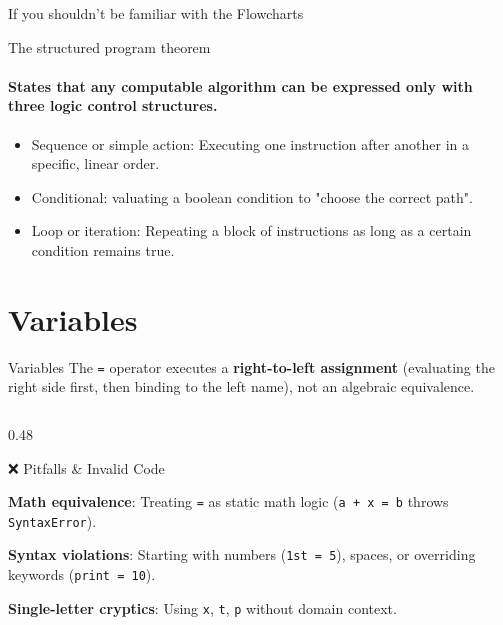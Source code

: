 \documentclass[aspectratio=169,19pt,english]{beamer}
\begin{document}
{\begin{frame}{If you shouldn't be familiar with the Flowcharts}
\begin{figure}
	\end{figure}
	
\end{frame}
\begin{frame}{The structured program theorem}
	\framesubtitle{States that any computable algorithm can be expressed only with three logic control structures.}
\begin{itemize}[label=$\circ$]
	\item Sequence or simple action: Executing one instruction after another in a specific, linear order.
	\item Conditional: valuating a boolean condition to "choose the correct path".
	\item Loop or iteration: Repeating a block of instructions as long as a certain condition remains true.
\end{itemize}
\end{frame}
\section{Variables}
\begin{frame}{Variables}
	The \texttt{=} operator executes a \textbf{right-to-left assignment} (evaluating the right side first, then binding to the left name), not an algebraic equivalence.
	\vspace{0.1cm}
	
	\begin{columns}[t]
		\begin{column}{0.48\textwidth}
			\begin{block}{❌ Pitfalls \& Invalid Code}
				\begin{itemize}
					\small{
					\item \textbf{Math equivalence}: Treating \texttt{=} as static math logic (\texttt{a + x = b} throws \texttt{SyntaxError}).
					
					\item \textbf{Syntax violations}: Starting with numbers (\texttt{1st = 5}), spaces, or overriding keywords (\texttt{print = 10}).
					\item \textbf{Single-letter cryptics}: Using \texttt{x}, \texttt{t}, \texttt{p} without domain context.}
				\end{itemize}
			\end{block}
		\end{column}
		

\end{columns}
\end{frame}}
\end{document}
